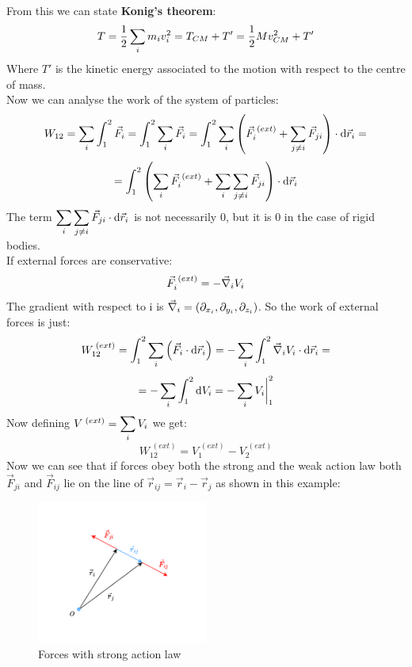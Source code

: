 From this we can state \textbf{Konig's theorem}:
\begin{equation}
    T = \dfrac{1}{2}\displaystyle\sum_i m_i v_i^2 = T_{CM} + T' = \dfrac{1}{2}M v_{CM}^2 + T'
\end{equation}
Where $T'$ is the kinetic energy associated to the motion with respect to the centre of mass.\\
Now we can analyse the work of the system of particles:
\begin{equation}
    W_{12} = \displaystyle\sum_i\int_{1}^{2}\vec{F}_i = \int_{1}^{2}\displaystyle\sum_i\vec{F}_i = \int_{1}^{2}\displaystyle\sum_i\left(\vec{F}_i^{\;(ext)} + \displaystyle\sum_{j\neq i}\vec{F}_{ji}\right)\cdot \dd{\vec{r}_i} =
\end{equation}
\begin{equation}
    = \int_{1}^{2}\left(\displaystyle\sum_i\vec{F}_i^{\;(ext)} + \displaystyle\sum_i\displaystyle\sum_{j\neq i}\vec{F}_{ji}\right)\cdot \dd{\vec{r}_i}
\end{equation}
The term $\displaystyle\sum_i\displaystyle\sum_{j\neq i}\vec{F}_{ji}\cdot \dd{\vec{r}_i}$ is not necessarily 0, but it is 0 in the case of rigid bodies.\\
If external forces are conservative:
\begin{equation}
    \vec{F}_i^{\;(ext)} = -\vec{\nabla}_i V_i
\end{equation}
The gradient with respect to i is $\vec{\nabla}_i = \left(\partial_{x_i}, \partial_{y_i}, \partial_{z_i}\right)$. So the work of external forces is just:
\begin{equation}
    W_{12}^{\;(ext)} = \int_{1}^{2}\displaystyle\sum_i\left(\vec{F}_i\cdot\dd{\vec{r}_i}\right) = -\displaystyle\sum_i\int_{1}^{2}\vec{\nabla}_i V_i\cdot\dd{\vec{r}_i} =
\end{equation}
\begin{equation}
    = -\displaystyle\sum_i\int_{1}^{2}\dd{V_i} = -\displaystyle\sum_i V_i\bigg|_1^2
\end{equation}
Now defining $V^{\;(ext)} = \displaystyle\sum_i V_i$ we get:
\begin{equation}
    W_{12}^{\;(ext)} = V^{\;(ext)}_1 - V^{\;(ext)}_2
\end{equation}
Now we can see that if forces obey both the strong and the weak action law both $\vec{F}_{ji}$ and $\vec{F}_{ij}$ lie on the line of $\vec{r}_{ij} = \vec{r}_i-\vec{r}_j$ as shown in this example:
\begin{figure}[H]
    \centering
    \includegraphics[width=0.5\textwidth]{res/svg/forcesstronglaw.drawio}
    \caption{Forces with strong action law}
    \label{fig:image5}
\end{figure}
